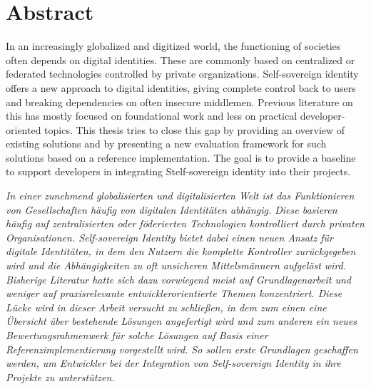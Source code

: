 \chapter*{Abstract}

In an increasingly globalized and digitized world, the functioning of societies often depends on digital identities. These are commonly based on centralized or federated technologies controlled by private organizations. Self-sovereign identity offers a new approach to digital identities, giving complete control back to users and breaking dependencies on often insecure middlemen. Previous literature on this has mostly focused on foundational work and less on practical developer-oriented topics. This thesis tries to close this gap by providing an overview of existing solutions and by presenting a new evaluation framework for such solutions based on a reference implementation. The goal is to provide a baseline to support developers in integrating Stelf-sovereign identity into their projects.

\textit{In einer zunehmend globalisierten und digitalisierten Welt ist das Funktionieren von Gesellschaften häufig von digitalen Identitäten abhängig. Diese basieren häufig auf zentralisierten oder föderierten Technologien kontrolliert durch privaten Organisationen. Self-sovereign Identity bietet dabei einen neuen Ansatz für digitale Identitäten, in dem den Nutzern die komplette Kontroller zurückgegeben wird und die Abhängigkeiten zu oft unsicheren Mittelsmännern aufgelöst wird. Bisherige Literatur hatte sich dazu vorwiegend meist auf Grundlagenarbeit und weniger auf praxisrelevante entwicklerorientierte Themen konzentriert. Diese Lücke wird in dieser Arbeit versucht zu schließen, in dem zum einen eine Übersicht über bestehende Lösungen angefertigt wird und zum anderen ein neues Bewertungsrahmenwerk für solche Lösungen auf Basis einer Referenzimplementierung vorgestellt wird. So sollen erste Grundlagen geschaffen werden, um Entwickler bei der Integration von Self-sovereign Identity in ihre Projekte zu unterstützen.}

